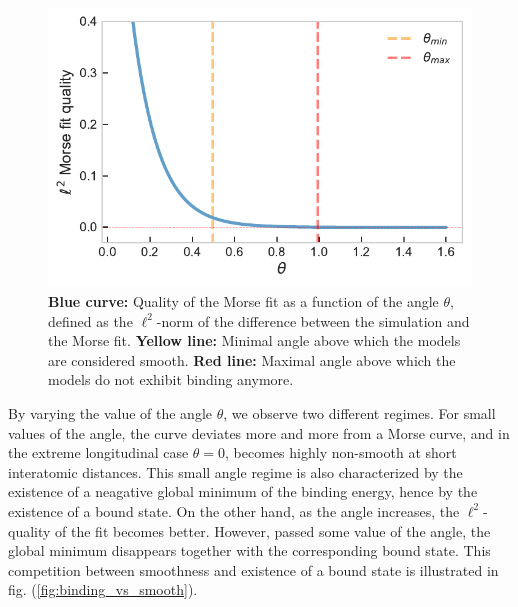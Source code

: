 \documentclass[reprint, amsmath, amssymb, aps, pra]{revtex4-2}
\begin{document}
    \begin{figure}
        \includegraphics[scale=0.75]{figures/morse_quality.pdf}
        \caption{\label{fig:morse_quality}\textbf{Blue curve:} Quality of the Morse fit as a function of the angle $\theta$, defined as the $\ell^2$-norm of the difference between the simulation and the Morse fit. \textbf{Yellow line:} Minimal angle above which the models are considered smooth. \textbf{Red line:} Maximal angle above which the models do not exhibit binding anymore.}
    \end{figure}

    By varying the value of the angle $\theta$, we observe two different regimes. For small values of the angle, the curve deviates more and more from a Morse curve, and in the extreme longitudinal case $\theta=0$, becomes highly non-smooth at short interatomic distances. This small angle regime is also characterized by the existence of a neagative global minimum of the binding energy, hence by the existence of a bound state. On the other hand, as the angle increases, the $\ell^2$-quality of the fit becomes better. However, passed some value of the angle, the global minimum disappears together with the corresponding bound state. This competition between smoothness and existence of a bound state is illustrated in fig. (\ref{fig:binding_vs_smooth}).
\end{document}
